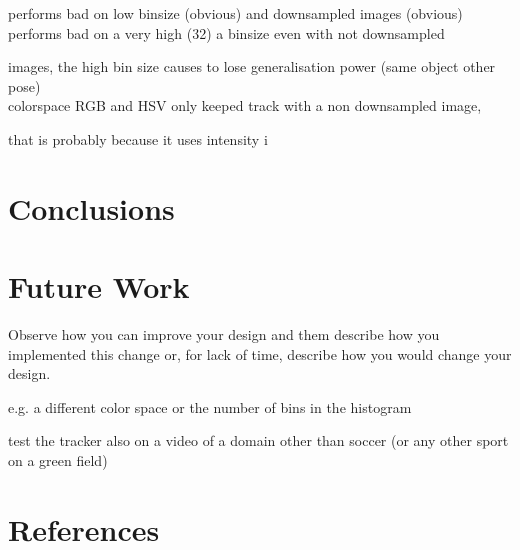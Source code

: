 \documentclass[a4paper,11pt]{article}
\begin{document}
performs bad on low binsize (obvious) and downsampled images (obvious)\\



performs bad on a very high (32) a binsize even with not downsampled

images, the high bin size causes to lose generalisation power (same object other pose)\\

		

colorspace RGB and HSV only keeped track with a non downsampled image,

that is probably because it uses intensity i





\section{Conclusions} \label{sec:conc}

\section{Future Work} \label{sec:fut}

Observe how you can improve your design and them describe how you implemented this change or, for lack of time, describe how you would change your design. 



e.g. a different color space or the number of bins in the histogram

test the tracker also on a video of a domain other than soccer (or any other sport on a green field)
















\section{References} 











\renewcommand\bibname{References}




\end{document}
